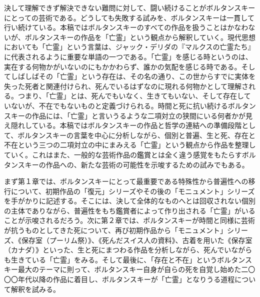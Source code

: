 \documentclass[b5j,twoside,twocolumn]{utarticle}
\begin{document}
決して理解できず解決できない難問に対して、闘い続けることがボルタンスキーにとっての芸術である。どうしても失敗する試みを、ボルタンスキーは一貫して行い続けている。本稿ではボルタンスキーのすべての作品を扱うことはかなわないが、ボルタンスキーの作品を「亡霊」という観点から解釈していく。現代思想においても「亡霊」という言葉は、ジャック・デリダの『マルクスの亡霊たち』に代表されるように重要な単語の一つである。「亡霊」を感じる時というのは、実在する何物かがいないのにもかかわらず、誰かの気配を感じる時である。そしてしばしばその「亡霊」という存在は、その名の通り、この世からすでに実体を失った死者と関連付けられ、死んでいるはずなのに現れる何物かとして理解される。つまり、「亡霊」とは、死んでもいなく、生きてもいない、そして存在していないが、不在でもないものと定義づけられる。時間と死に抗い続けるボルタンスキーの作品には、「亡霊」と言いうるような二項対立の狭間にいる何者かが見え隠れしている。本稿ではボルタンスキーの作品と哲学の連結への準備段階として、ボルタンスキーの言葉を中心に分析しながら、個別と普遍、生と死、存在と不在という三つの二項対立の中にまみえる「亡霊」という観点から作品を整理していく。これはまた、一般的な芸術作品の鑑賞とは全く違う感覚をもたらすボルタンスキーの作品への、新たな芸術の可能性を示唆するための試みでもある。


まず第１章では、ボルタンスキーにとって最重要である特殊性から普遍性への移行について、初期作品の「復元」シリーズやその後の「モニュメント」シリーズを手がかりに記述する。そこには、決して全体的なものへとは回収されない個別の主体でありながら、普遍性をもち鑑賞者によって作り出される「亡霊」がいることが示唆されるだろう。次に第２章では、ボルタンスキーが時間と同様に芸術が抗うものとしてきた死について、再び初期作品から「モニュメント」シリーズ、《保存室（プーリム祭）》、《死んだスイス人の資料》、古着を用いた《保存室（カナダ）》といった、生と死にまつわる作品を分析しながら、死んでいながらも生きている「亡霊」をみる。そして最後に、「存在と不在」というボルタンスキー最大のテーマに則って、ボルタンスキー自身が自らの死を自覚し始めた二〇〇〇年代以降の作品に着目し、ボルタンスキーが「亡霊」となりうる道程について解釈を試みる。
\end{document}
